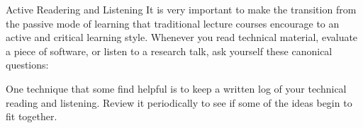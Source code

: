 \begin{frame}{Active Readering and Listening}
  It is very important to make the transition from the passive mode of learning
  that traditional lecture courses encourage to an active and critical learning style.
  Whenever you read technical material, evaluate a piece of software, or listen to
  a research talk, ask yourself these canonical questions:

  \begin{itemize}
  \end{itemize}

  One technique that some find helpful is to keep a written log of your technical
  reading and listening. Review it periodically to see if some of the ideas begin
  to fit together. 
\end{frame}
